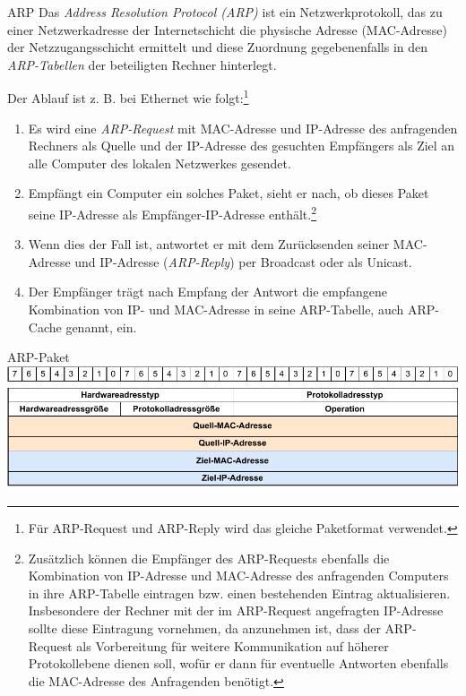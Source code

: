 \begin{defi}{ARP}
    Das \emph{Address Resolution Protocol (ARP)} ist ein Netzwerkprotokoll, das zu einer Netzwerkadresse der Internetschicht die physische Adresse (MAC-Adresse) der Netzzugangsschicht ermittelt und diese Zuordnung gegebenenfalls in den \emph{ARP-Tabellen} der beteiligten Rechner hinterlegt.

    Der Ablauf ist z. B. bei Ethernet wie folgt:\footnote{Für ARP-Request und ARP-Reply wird das gleiche Paketformat verwendet.}
    \begin{enumerate}
        \item Es wird eine \emph{ARP-Request} mit MAC-Adresse und IP-Adresse des anfragenden Rechners als Quelle und der IP-Adresse des gesuchten Empfängers als Ziel an alle Computer des lokalen Netzwerkes gesendet.
        \item Empfängt ein Computer ein solches Paket, sieht er nach, ob dieses Paket seine IP-Adresse als Empfänger-IP-Adresse enthält.\footnote{Zusätzlich können die Empfänger des ARP-Requests ebenfalls die Kombination von IP-Adresse und MAC-Adresse des anfragenden Computers in ihre ARP-Tabelle eintragen bzw. einen bestehenden Eintrag aktualisieren. Insbesondere der Rechner mit der im ARP-Request angefragten IP-Adresse sollte diese Eintragung vornehmen, da anzunehmen ist, dass der ARP-Request als Vorbereitung für weitere Kommunikation auf höherer Protokollebene dienen soll, wofür er dann für eventuelle Antworten ebenfalls die MAC-Adresse des Anfragenden benötigt.}
        \item Wenn dies der Fall ist, antwortet er mit dem Zurücksenden seiner MAC-Adresse und IP-Adresse (\emph{ARP-Reply}) per Broadcast oder als Unicast.
        \item Der Empfänger trägt nach Empfang der Antwort die empfangene Kombination von IP- und MAC-Adresse in seine ARP-Tabelle, auch ARP-Cache genannt, ein.
    \end{enumerate}
\end{defi}

\begin{bonus}{ARP-Paket}
    \centering
    \includegraphics[width=.5\textwidth]{includes/figures/defi_arp_paket.pdf}
\end{bonus}

